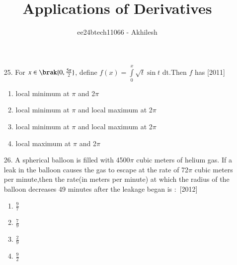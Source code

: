 \documentclass[journal,12pt,twocolumn]{IEEEtran}
\theoremstyle{remark}
\begin{document}

\vspace{3cm}

\title{Applications of Derivatives}
\author{ee24btech11066 - Akhilesh}
\maketitle
\newpage
\bigskip

\renewcommand{\thefigure}{\theenumi}
\renewcommand{\thetable}{\theenumi}
\begin{enumerate}
\item[25.] For $x \in \brak{0,\frac{5\pi}{2}}$, define $f(x)=\int\limits_0^x\sqrt{t}\sin t$ dt.Then $f$ has \hfill{[2011]}\\
\begin{enumerate}
    \item   local minimum at $\pi$ and 2$\pi$\\
    \item   local minimum at $\pi$ and local maximum at 2$\pi$
    \item   local minimum at $\pi$ and local maximum at 2$\pi$
    \item   local maximum at $\pi$ and 2$\pi$\\
\end{enumerate}
    
\item[26.] A spherical balloon is filled with 4500$\pi$ cubic meters of helium gas. If a leak in the balloon causes the gas to escape at the rate of 72$\pi$ cubic meters per minute,then the rate{(in meters per minute)} at which the radius of the balloon decreases 49 minutes after the leakage began is $:$ \hfill{[2012]}\\
\begin{enumerate}
    \item   $\frac{9}{7}$\\
    \item   $\frac{7}{9}$\\
    \item   $\frac{2}{9}$\\
    \item   $\frac{9}{2}$ \\
\end{enumerate} 


\end{enumerate}
\end{document}
